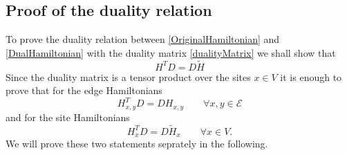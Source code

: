 \documentclass[11pt]{article}
\numberwithin{equation}{section}
\numberwithin{equation}{subsection}
\begin{document}
\subsection{Proof of the duality relation}\label{subsectionDualityProof}
To prove the duality relation between \eqref{OriginalHamiltonian} and \eqref{DualHamiltonian} with the duality matrix \eqref{dualityMatrix} we shall show that 
\begin{equation}
    H^{T}D=D\widetilde{H}
\end{equation}
Since the duality matrix is a tensor product over the sites $x\in V$ it is enough to prove that for the edge Hamiltonians
\begin{equation}\label{edgeDualRealtion}
    H_{x,y}^{T}D=DH_{x,y}\qquad \forall x,y\in \mathcal{E}
\end{equation}
and for the site Hamiltonians 
\begin{equation}\label{siteDualRelation}
    H_{x}^{T}D=D\widetilde{H}_{x}\qquad \forall x\in V.
\end{equation}
We will prove these two statements seprately in the following. 
\end{document}
